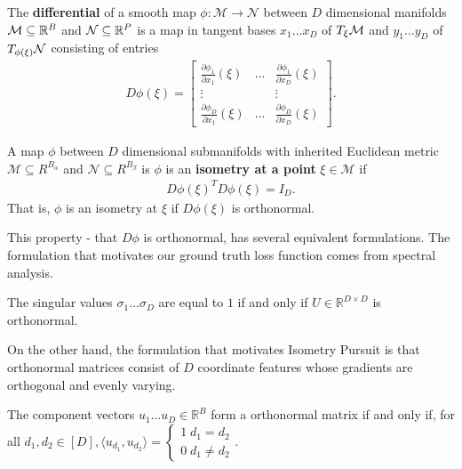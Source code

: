 \begin{definition}
The \textbf{differential} of a smooth map $\phi:\mathcal M \to \mathcal N$ between $D$ dimensional manifolds $\mathcal{M} \subseteq \mathbb R^B$ and $\mathcal{N} \subseteq \mathbb R^P$ is a map in tangent bases $x_1 \dots x_{D}$ of $T_\xi \mathcal{M}$ and $y_1 \dots y_{D}$ of $T_{\phi(\xi)} \mathcal{N}$ consisting of entries
\begin{align}
\label{eq:diff}
    D\phi (\xi) = \begin{bmatrix}
    \frac{\partial \phi_1  }{\partial x_1}(\xi)  & \dots & \frac{\partial \phi_1 }{\partial x_D}(\xi)  \\
    \vdots & & \vdots \\
    \frac{\partial \phi_D }{\partial x_1}(\xi)  & \dots & \frac{\partial \phi_{D}  }{\partial x_{D}}(\xi) 
    \end{bmatrix}.
\end{align}
\end{definition}

\begin{definition}
\label{def:isometric_at_a_point}
A map $\phi$ between $D$ dimensional submanifolds with inherited Euclidean metric $\mathcal M \subseteq R^{B_\alpha}$ and $\mathcal N  \subseteq R^{B_\beta}$ is 
$\phi$ is an \textbf{isometry at a point} $\xi \in \mathcal M$ if
\begin{align}
{D \phi (\xi)}^T D \phi (\xi) = I_D.
\end{align}
That is, $\phi$ is an isometry at $\xi$ if $D \phi (\xi)$ is orthonormal.
\end{definition}

This property - that $D\phi$ is orthonormal, has several equivalent formulations.
The formulation that motivates our ground truth loss function comes from spectral analysis.
\begin{proposition}
\label{prop:orthonormal_spectrum}
The singular values $\sigma_1 \dots \sigma_D$ are equal to $1$ if and only if $U \in \mathbb{R}^{D \times D}$ is orthonormal.
\end{proposition}
On the other hand, the formulation that motivates Isometry Pursuit is that orthonormal matrices consist of $D$ coordinate features whose gradients are orthogonal and evenly varying.
\begin{proposition}
\label{prop:orthonormal_basis}
The component vectors $u_1 \dots u_D \in \mathbb R^B$ form a orthonormal matrix if and only if, for all $d_1, d_2 \in [D], \langle u_{d_1}, u_{d_2} \rangle = \begin{cases}
1 \; d_1 = d_2 \\ 
0 \; d_1 \neq d_2 
\end{cases}$.
\end{proposition}

